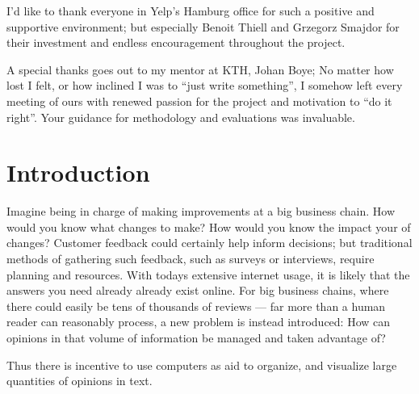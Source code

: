 \documentclass[a4paper,11pt]{kth-mag}
\begin{document}
I'd like to thank everyone in Yelp's Hamburg office for such a positive and supportive environment; but especially
Benoit Thiell and Grzegorz Smajdor for their investment and endless encouragement throughout the project.

A special thanks goes out to my mentor at KTH, Johan Boye; No matter how lost I felt, or how inclined I was to
``just write something'', I somehow left every meeting of ours with renewed passion for the project and motivation to
``do it right''. Your guidance for methodology and evaluations was invaluable.


\clearpage

\tableofcontents*


\mainmatter
\pagestyle{newchap}
\chapter{Introduction}
Imagine being in charge of making improvements at a big business chain.
How would you know what changes to make? How would you know the impact your of changes?
Customer feedback could certainly help inform decisions; but traditional methods of gathering such feedback,
such as surveys or interviews, require planning and resources.
With todays extensive internet usage, it is likely that the answers you need already
already exist online. For big business chains, where there could easily be tens of thousands of reviews ---
far more than a human reader can reasonably process, a new problem is instead introduced: How can opinions in that
volume of information be managed and taken advantage of?

Thus there is incentive to use computers as aid to organize, and visualize large quantities of opinions in text.
\end{document}

